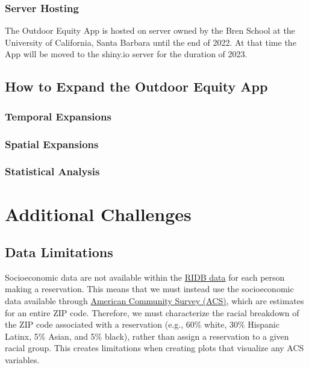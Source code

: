 \documentclass[
  11 pt,
  openany]{book}
\begin{document}
\hypertarget{server-hosting}{%
\subsection{Server Hosting}\label{server-hosting}}

The Outdoor Equity App is hosted on server owned by the Bren School at the University of California, Santa Barbara until the end of 2022. At that time the App will be moved to the shiny.io server for the duration of 2023.

\hypertarget{how-to-expand-the-outdoor-equity-app}{%
\section{How to Expand the Outdoor Equity App}\label{how-to-expand-the-outdoor-equity-app}}

\hypertarget{temporal-expansions}{%
\subsection{Temporal Expansions}\label{temporal-expansions}}

\hypertarget{spatial-expansions}{%
\subsection{Spatial Expansions}\label{spatial-expansions}}

\hypertarget{statistical-analysis}{%
\subsection{Statistical Analysis}\label{statistical-analysis}}

\hypertarget{additional-challenges}{%
\chapter{Additional Challenges}\label{additional-challenges}}

\hypertarget{data-limitations}{%
\section{Data Limitations}\label{data-limitations}}

Socioeconomic data are not available within the \href{https://ridb.recreation.gov/landing}{RIDB data} for each person making a reservation. This means that we must instead use the socioeconomic data available through \href{https://www.census.gov/programs-surveys/acs/data.html}{American Community Survey (ACS)}, which are estimates for an entire ZIP code. Therefore, we must characterize the racial breakdown of the ZIP code associated with a reservation (e.g., 60\% white, 30\% Hispanic Latinx, 5\% Asian, and 5\% black), rather than assign a reservation to a given racial group. This creates limitations when creating plots that visualize any ACS variables.
\end{document}

